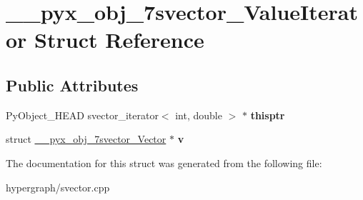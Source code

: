 \hypertarget{struct____pyx__obj__7svector__ValueIterator}{
\section{\_\-\_\-pyx\_\-obj\_\-7svector\_\-ValueIterator Struct Reference}
\label{struct____pyx__obj__7svector__ValueIterator}
}
\subsection*{Public Attributes}
\begin{DoxyCompactItemize}
\item 
\hypertarget{struct____pyx__obj__7svector__ValueIterator_a57304227c09680a9e8376afedc7e679f}{
PyObject\_\-HEAD svector\_\-iterator$<$ int, double $>$ $\ast$ {\bfseries thisptr}}
\label{struct____pyx__obj__7svector__ValueIterator_a57304227c09680a9e8376afedc7e679f}

\item 
\hypertarget{struct____pyx__obj__7svector__ValueIterator_a17c1173ab865a2d12509a35355372177}{
struct \hyperlink{struct____pyx__obj__7svector__Vector}{\_\-\_\-pyx\_\-obj\_\-7svector\_\-Vector} $\ast$ {\bfseries v}}
\label{struct____pyx__obj__7svector__ValueIterator_a17c1173ab865a2d12509a35355372177}

\end{DoxyCompactItemize}


The documentation for this struct was generated from the following file:\begin{DoxyCompactItemize}
\item 
hypergraph/svector.cpp\end{DoxyCompactItemize}
